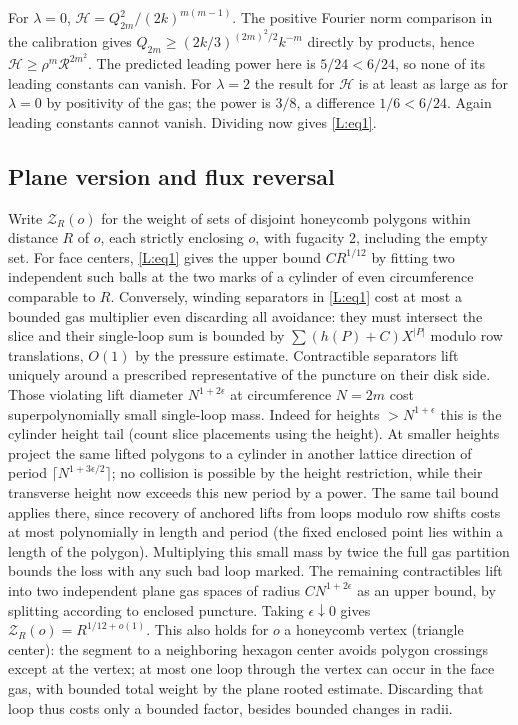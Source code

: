 \documentclass[11pt]{article}
\numberwithin{equation}{section}
\theoremstyle{definition}\newtheorem{definition}[theorem]{Definition}
\theoremstyle{remark}\newtheorem{remark}[theorem]{Remark}
\begin{document}
For \(\lambda=0\), \(\mathcal H=Q_{2m}^2/(2k)^{m(m-1)}\). The positive Fourier norm comparison in the calibration gives \(Q_{2m}\ge (2k/3)^{(2m)^2/2} k^{-m}\) directly by products, hence \(\mathcal H\ge \rho^m\mathcal R^{2m^2}\). The predicted leading power here is \(5/24<6/24\), so none of its leading constants can vanish. For \(\lambda=2\) the result for \(\mathcal H\) is at least as large as for \(\lambda=0\) by positivity of the gas; the power is \(3/8\), a difference \(1/6<6/24\). Again leading constants cannot vanish. Dividing now gives \eqref{L:eq1}.

\subsection{Plane version and flux reversal}\label{L:step13}

Write \(\mathcal Z_R(o)\) for the weight of sets of disjoint honeycomb polygons within distance \(R\) of \(o\), each strictly enclosing \(o\), with fugacity 2, including the empty set. For face centers, \eqref{L:eq1} gives the upper bound \(C R^{1/12}\) by fitting two independent such balls at the two marks of a cylinder of even circumference comparable to \(R\). Conversely, winding separators in \eqref{L:eq1} cost at most a bounded gas multiplier even discarding all avoidance: they must intersect the slice and their single-loop sum is bounded by \(\sum (h(P)+C)X^{|P|}\) modulo row translations, \(O(1)\) by the pressure estimate. Contractible separators lift uniquely around a prescribed representative of the puncture on their disk side. Those violating lift diameter \(N^{1+2\epsilon}\) at circumference \(N=2m\) cost superpolynomially small single-loop mass. Indeed for heights \(>N^{1+\epsilon}\) this is the cylinder height tail (count slice placements using the height). At smaller heights project the same lifted polygons to a cylinder in another lattice direction of period \(\lceil N^{1+3\epsilon/2}\rceil\); no collision is possible by the height restriction, while their transverse height now exceeds this new period by a power. The same tail bound applies there, since recovery of anchored lifts from loops modulo row shifts costs at most polynomially in length and period (the fixed enclosed point lies within a length of the polygon). Multiplying this small mass by twice the full gas partition bounds the loss with any such bad loop marked. The remaining contractibles lift into two independent plane gas spaces of radius \(C N^{1+2\epsilon}\) as an upper bound, by splitting according to enclosed puncture. Taking \(\epsilon\downarrow0\) gives
\(\mathcal Z_R(o)=R^{1/12+o(1)}\).
This also holds for \(o\) a honeycomb vertex (triangle center): the segment to a neighboring hexagon center avoids polygon crossings except at the vertex; at most one loop through the vertex can occur in the face gas, with bounded total weight by the plane rooted estimate. Discarding that loop thus costs only a bounded factor, besides bounded changes in radii.
\end{document}
